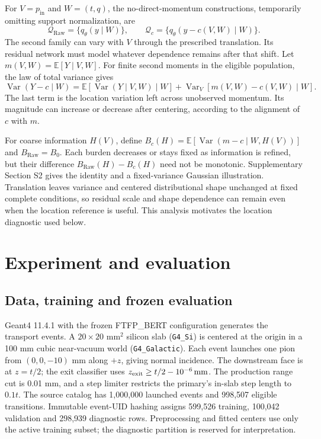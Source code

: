 \documentclass[11pt]{article}
\newcommand{\pin}{p_{\mathrm{in}}}
\newcommand{\raw}{\mathrm{Raw}}
\begin{document}
For $V=\pin$ and $W=(t,q)$, the no-direct-momentum constructions, temporarily
omitting support normalization, are
\begin{equation}
 \mathcal Q_{\raw}=\{q_\theta(y\mid W)\},\qquad
 \mathcal Q_c=\{q_\theta(y-c(V,W)\mid W)\}.
\end{equation}
The second family can vary with $V$ through the prescribed translation.
Its residual network must model whatever dependence remains after that shift.
Let $m(V,W)=\mathbb E[Y\mid V,W]$. For finite second moments in the eligible
population, the law of total variance gives
\begin{equation}
 \operatorname{Var}(Y-c\mid W)=
 \mathbb E[\operatorname{Var}(Y\mid V,W)\mid W]
 +\operatorname{Var}_V[m(V,W)-c(V,W)\mid W].
 \label{eq:location_burden}
\end{equation}
The last term is the location variation left across unobserved momentum.
Its magnitude can increase or decrease after centering, according to the
alignment of $c$ with $m$.

For coarse information $H(V)$, define
$B_c(H)=\mathbb E[\operatorname{Var}(m-c\mid W,H(V))]$ and $B_{\raw}=B_0$.
Each burden decreases or stays fixed as information is refined, but their
difference $B_{\raw}(H)-B_c(H)$ need not be monotonic. Supplementary Section S2
gives the identity and a fixed-variance Gaussian illustration. Translation
leaves variance and centered distributional shape unchanged at fixed complete
conditions, so residual scale and shape dependence can remain even when the
location reference is useful. This analysis motivates the location diagnostic
used below.

\clearpage
\section{Experiment and evaluation}

\subsection{Data, training and frozen evaluation}
\label{sec:fresh_design}

Geant4 11.4.1 with the frozen FTFP\_BERT configuration generates the transport
events. A $20\times20$ mm$^2$ silicon slab (\texttt{G4\_Si}) is centered
at the origin in a 100 mm cubic near-vacuum world (\texttt{G4\_Galactic}).
Each event launches one pion from $(0,0,-10)$ mm along $+z$, giving normal
incidence. The downstream face is at $z=t/2$; the exit classifier uses
$z_{\rm exit}\geq t/2-10^{-6}\,\mathrm{mm}$. The production range cut is 0.01 mm,
and a step limiter restricts the primary's in-slab step length to $0.1t$.
The source catalog has 1,000,000 launched events and 998,507 eligible
transitions. Immutable event-UID hashing assigns 599,526 training,
100,042 validation and 298,939 diagnostic rows. Preprocessing and fitted
centers use only the active training subset; the diagnostic partition is
reserved for interpretation.
\end{document}
